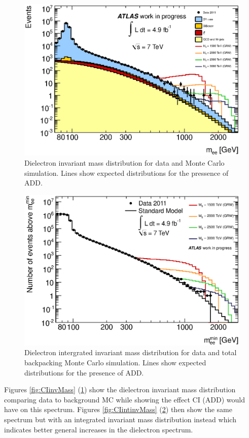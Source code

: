 	\begin{figure}[h!p]
	\centering
	\includegraphics[width=0.9\linewidth]{images/ADD_inv_mass.eps}
	\caption{Dielectron invariant mass distribution for data and Monte Carlo simulation. Lines show expected distributions for the pressence of ADD.}
	\label{fig:ADDinvMass}
	\end{figure}

	\begin{figure}[h!p]
	\centering
	\includegraphics[width=0.9\linewidth]{images/ADD_int_inv_mass.eps}
	\caption{Dielectron intergrated invariant mass distribution for data and total backpacking Monte Carlo simulation. Lines show expected distributions for the presence of ADD.}
	\label{fig:ADDintinvMass}
	\end{figure}


	Figures \ref{fig:CIinvMass} (\ref{fig:ADDinvMass}) show the dielectron invariant mass distribution comparing data to background MC while showing the effect CI (ADD) would have on this spectrum. Figures \ref{fig:CIintinvMass} (\ref{fig:ADDintinvMass}) then show the same spectrum but with an integrated invariant mass distribution instead which indicates better general increases in the dielectron spectrum.





